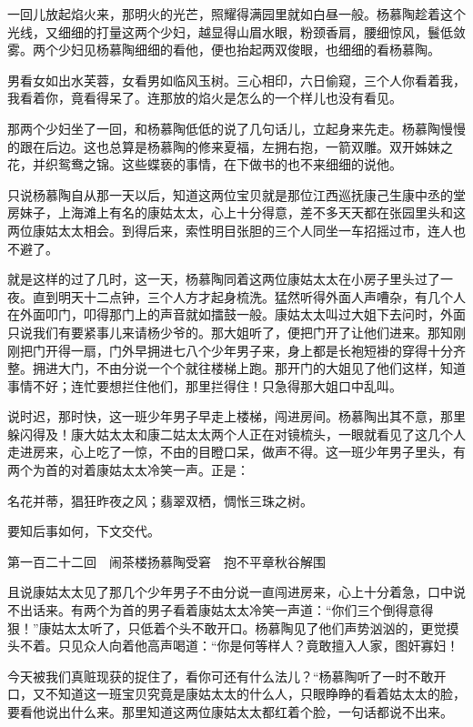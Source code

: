 \documentclass[12pt,UTF8]{ctexbook}
\begin{document}
{{{一回儿放起焰火来，那明火的光芒，照耀得满园里就如白昼一般。杨慕陶趁着这个光线，又细细的打量这两个少妇，越显得山眉水眼，粉颈香肩，腰细惊风，鬟低敛雾。两个少妇见杨慕陶细细的看他，便也抬起两双俊眼，也细细的看杨慕陶。

男看女如出水芙蓉，女看男如临风玉树。三心相印，六日偷窥，三个人你看着我，我看着你，竟看得呆了。连那放的焰火是怎么的一个样儿也没有看见。

那两个少妇坐了一回，和杨慕陶低低的说了几句话儿，立起身来先走。杨慕陶慢慢的跟在后边。这也总算是杨慕陶的修来夏福，左拥右抱，一箭双雕。双开姊妹之花，并织鸳鸯之锦。这些蝶亵的事情，在下做书的也不来细细的说他。

只说杨慕陶自从那一天以后，知道这两位宝贝就是那位江西巡抚康己生康中丞的堂房妹子，上海滩上有名的康姑太太，心上十分得意，差不多天天都在张园里头和这两位康姑太太相会。到得后来，索性明目张胆的三个人同坐一车招摇过市，连人也不避了。

就是这样的过了几时，这一天，杨慕陶同着这两位康姑太太在小房子里头过了一夜。直到明天十二点钟，三个人方才起身梳洗。猛然听得外面人声嘈杂，有几个人在外面叩门，叩得那门上的声音就如擂鼓一般。康姑太太叫过大姐下去问时，外面只说我们有要紧事儿来请杨少爷的。那大姐听了，便把门开了让他们进来。那知刚刚把门开得一扇，门外早拥进七八个少年男子来，身上都是长袍短褂的穿得十分齐整。拥进大门，不由分说一个个就往楼梯上跑。那开门的大姐见了他们这样，知道事情不好；连忙要想拦住他们，那里拦得住！只急得那大姐口中乱叫。

说时迟，那时快，这一班少年男子早走上楼梯，闯进房间。杨慕陶出其不意，那里躲闪得及！康大姑太太和康二姑太太两个人正在对镜梳头，一眼就看见了这几个人走进房来，心上吃了一惊，不由的目瞪口呆，做声不得。这一班少年男子里头，有两个为首的对着康姑太太冷笑一声。正是：

名花并蒂，猖狂昨夜之风；翡翠双栖，惆怅三珠之树。

要知后事如何，下文交代。





第一百二十二回　闹茶楼扬慕陶受窘　抱不平章秋谷解围





且说康姑太太见了那几个少年男子不由分说一直闯进房来，心上十分着急，口中说不出话来。有两个为首的男子看着康姑太太冷笑一声道：“你们三个倒得意得狠！”康姑太太听了，只低着个头不敢开口。杨慕陶见了他们声势汹汹的，更觉摸头不着。只见众人向着他高声喝道：“你是何等样人？竟敢擅入人家，图奸寡妇！

今天被我们真赃现获的捉住了，看你可还有什么法儿？“杨慕陶听了一时不敢开口，又不知道这一班宝贝究竟是康姑太太的什么人，只眼睁睁的看着姑太太的脸，要看他说出什么来。那里知道这两位康姑太太都红着个脸，一句话都说不出来。

}}}
\end{document}
